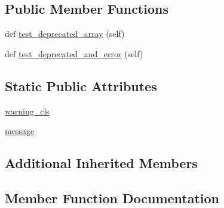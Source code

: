 \subsection*{Public Member Functions}
\begin{DoxyCompactItemize}
\item 
def \hyperlink{classnumpy_1_1core_1_1tests_1_1test__deprecations_1_1TestDeprecateSubarrayDTypeDuringArrayCoercion_aa7a2820d0c7a9f8c22b72b99d7228aa3}{test\+\_\+deprecated\+\_\+array} (self)
\item 
def \hyperlink{classnumpy_1_1core_1_1tests_1_1test__deprecations_1_1TestDeprecateSubarrayDTypeDuringArrayCoercion_a81940c989212ee997428050a1e717264}{test\+\_\+deprecated\+\_\+and\+\_\+error} (self)
\end{DoxyCompactItemize}
\subsection*{Static Public Attributes}
\begin{DoxyCompactItemize}
\item 
\hyperlink{classnumpy_1_1core_1_1tests_1_1test__deprecations_1_1TestDeprecateSubarrayDTypeDuringArrayCoercion_af4c6b59224c8f014015f1ab4f8d98d00}{warning\+\_\+cls}
\item 
\hyperlink{classnumpy_1_1core_1_1tests_1_1test__deprecations_1_1TestDeprecateSubarrayDTypeDuringArrayCoercion_a157731991e9cbb70fb0d284cc13159fd}{message}
\end{DoxyCompactItemize}
\subsection*{Additional Inherited Members}


\subsection{Member Function Documentation}
\mbox{\label{classnumpy_1_1core_1_1tests_1_1test__deprecations_1_1TestDeprecateSubarrayDTypeDuringArrayCoercion_a81940c989212ee997428050a1e717264}} 

